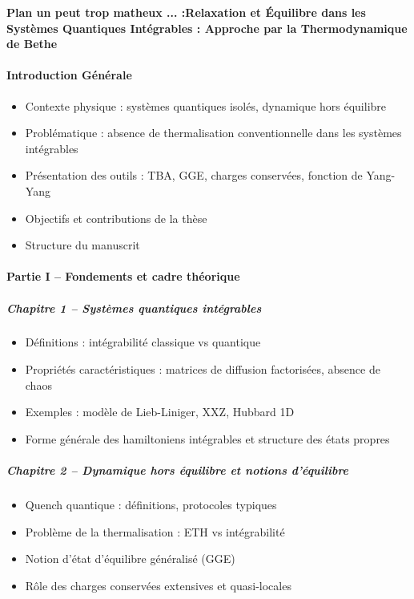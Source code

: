 \textbf{Plan un peut trop matheux ... :Relaxation et Équilibre dans les Systèmes Quantiques Intégrables : Approche par la Thermodynamique de Bethe}

\paragraph{Introduction Générale}
\begin{itemize}
    \item Contexte physique : systèmes quantiques isolés, dynamique hors équilibre
    \item Problématique : absence de thermalisation conventionnelle dans les systèmes intégrables
    \item Présentation des outils : TBA, GGE, charges conservées, fonction de Yang-Yang
    \item Objectifs et contributions de la thèse
    \item Structure du manuscrit
\end{itemize}

\paragraph{Partie I – Fondements et cadre théorique}

\subparagraph{Chapitre 1 – Systèmes quantiques intégrables}
\begin{itemize}
    \item Définitions : intégrabilité classique vs quantique
    \item Propriétés caractéristiques : matrices de diffusion factorisées, absence de chaos
    \item Exemples : modèle de Lieb-Liniger, XXZ, Hubbard 1D
    \item Forme générale des hamiltoniens intégrables et structure des états propres
\end{itemize}

\subparagraph{Chapitre 2 – Dynamique hors équilibre et notions d’équilibre}
\begin{itemize}
    \item Quench quantique : définitions, protocoles typiques
    \item Problème de la thermalisation : ETH vs intégrabilité
    \item Notion d’état d’équilibre généralisé (GGE)
    \item Rôle des charges conservées extensives et quasi-locales
\end{itemize}

